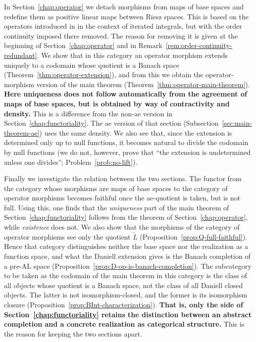 In Section~\ref{chap:operator} we detach morphisms from maps of base spaces and
redefine them as positive linear maps between Riesz spaces.
This is based on the operators introduced in \cite{Yamagami} in the context of
iterated integrals, but with the order continuity imposed there removed.
The reason for removing it is given at the beginning of
Section~\ref{chap:operator} and in
Remark~\ref{rem:order-continuity-redundant}.
We show that in this category an operator morphism extends uniquely to a
codomain whose quotient is a Banach space
(Theorem~\ref{thm:operator-extension}), and from this we obtain the
operator-morphism version of the main theorem
(Theorem~\ref{thm:operator-main-theorem}).
\textbf{Here uniqueness does not follow automatically from the agreement of maps
of base spaces, but is obtained by way of contractivity and density.}
This is a difference from the non-ae version in
Section~\ref{chap:functoriality}.
The ae version of that section
(Subsection~\ref{sec:main-theorem-ae}) uses the same density.
We also see that, since the extension is determined only up to null functions,
it becomes natural to divide the codomain by null functions (we do not, however,
prove that ``the extension is undetermined unless one divides'';
Problem~\ref{prob:no-lift}).

Finally we investigate the relation between the two sections.
The functor from the category whose morphisms are maps of base spaces to the
category of operator morphisms becomes faithful once the ae-quotient is taken,
but is not full.
Using this, one finds that the \emph{uniqueness} part of the main theorem of
Section~\ref{chap:functoriality} follows from the theorem of
Section~\ref{chap:operator}, while \emph{existence} does not.
We also show that the morphisms of the category of operator morphisms see only
the quotient $\widetilde{L}$
(Proposition~\ref{prop:Q-full-faithful}).
Hence that category distinguishes neither the base space nor the realization as
a function space, and what the Daniell extension gives is the Banach completion
of a pre-AL space
(Proposition~\ref{prop:D-op-is-banach-completion}).
The subcategory to be taken as the codomain of the main theorem in this category
is the class of all objects whose quotient is a Banach space, not the class of
all Daniell closed objects.
The latter is not isomorphism-closed, and the former is its isomorphism closure
(Proposition~\ref{prop:BInt-characterization}).
\textbf{That is, only the side of Section~\ref{chap:functoriality} retains the
distinction between an abstract completion and a concrete realization as
categorical structure.}
This is the reason for keeping the two sections apart.

